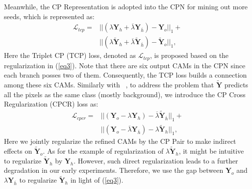 \documentclass[10pt,twocolumn,letterpaper]{article}
\begin{document}
Meanwhile, the CP Representation is adopted into the CPN for mining out more seeds, which is represented as:
\begin{equation}\label{tcp}
\begin{split}
\mathcal {L}_{tcp} = &||({\lambda}{\boldsymbol{Y}_h} + {\overline \lambda}{\boldsymbol{Y}_{\overline h}}) - {\boldsymbol{Y}_o}||_1 + \\
 &||({\lambda}\widetilde {\boldsymbol{Y}}_{h} + {\overline \lambda}\widetilde {\boldsymbol{Y}}_{{\overline h}}) - \widetilde {\boldsymbol{Y}}_{o}||_1,
 \end{split}
\end{equation}
Here the Triplet CP (TCP) loss, denoted as $\mathcal {L}_{tcp}$, is proposed based on the regularization in (\ref{eq3}). Note that there are six output CAMs in the CPN since each branch posses two of them. Consequently, the TCP loss builds a connection among these six CAMs. Similarly with ~\cite{seam}, to address the problem that $\widetilde  {\boldsymbol{Y}}$ predicts all the pixels as the same class (mostly background), we introduce the CP Cross Regularization (CPCR) loss as:
\begin{equation}\label{cpcr}
\begin{split}
\mathcal {L}_{cpcr} = &||(\boldsymbol{Y}_o - {\lambda}\boldsymbol{Y}_h) - {\overline \lambda}\widetilde {\boldsymbol{Y}}_{{\overline h}}||_1 + \\
 &||(\boldsymbol{Y}_o - {\overline \lambda}\boldsymbol{Y}_{\overline h}) - {\lambda}\widetilde {\boldsymbol{Y}}_{h}||_1,
 \end{split}
\end{equation}
Here we jointly regularize the refined CAMs by the CP Pair to make indirect effects on $\widetilde {\boldsymbol{Y}}_o$. As for the example of regularization of ${\lambda}\widetilde {\boldsymbol{Y}}_{h}$, it might be intuitive to regularize $\widetilde {\boldsymbol{Y}}_{h}$ by ${\boldsymbol{Y}_h}$. However, such direct regularization leads to a further degradation in our early experiments. Therefore, we use the gap between $\boldsymbol{Y}_o$ and ${\lambda}\boldsymbol{Y}_{\overline h}$ to regularize $\widetilde {\boldsymbol{Y}}_{h}$ in light of (\ref{eq3}).
\end{document}
